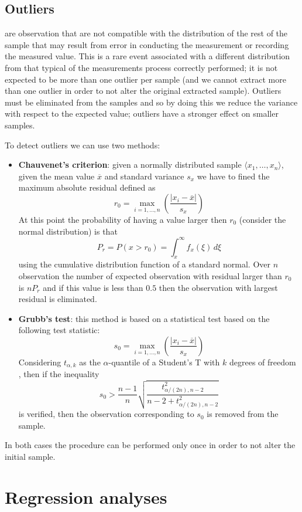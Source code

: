 	
\subsection{Outliers}
	 are observation that are not compatible with the distribution of the rest of the sample that may result from error in conducting the measurement or recording the measured value. This is a rare event associated with a different distribution from that typical of the measurements process correctly performed; it is not expected to be more than one outlier per sample (and we cannot extract more than one outlier in order to not alter the original extracted sample). Outliers must be eliminated from the samples and so by doing this we reduce the variance with respect to the expected value; outliers have a stronger effect on smaller samples.
	
	To detect outliers we can use two methods:
	\begin{itemize}
		\item \textbf{Chauvenet's criterion}: given a normally distributed sample $\langle x_1,\dots,x_n\rangle$, given the mean value $\overline x$ and standard variance $s_x$ we have to fined the maximum absolute residual defined as
		\[ r_ 0 = \max_{i=1,\dots,n} \left( \frac{|x_i-\overline x|}{s_x} \right) \]
		At this point the probability of having a value larger then $r_0$ (consider the normal distribution) is that
		\[ P_r = P(x>r_0) = \int_x^\infty f_x(\xi)\, d\xi \]
		using the cumulative distribution function of a standard normal. Over $n$ observation the number of expected observation with residual larger than $r_0$ is $n P_r$ and if this value is less than $0.5$ then the observation with largest residual is eliminated.
		
		\item \textbf{Grubb's test}: this method is based on a statistical test based on the following test statistic:
		\[ s_0 = \max_{i=1,\dots,n} \left( \frac{|x_i-\overline x|}{s_x} \right) \]
		Considering $t_{\alpha,k}$ as the $\alpha$-quantile of a Student's T with $k$ degrees of freedom , then if the inequality
		\[ s_0 > \frac{n-1}{n} \sqrt{\frac{t^2_{\alpha/(2n),n-2}}{n-2+ t^2_{\alpha/(2n), n-2}}} \]
		is verified, then the observation corresponding to $s_0$ is removed from the sample.
		
	\end{itemize}
	In both cases the procedure can be performed only once in order to not alter the initial sample.
	
\section{Regression analyses}
	
